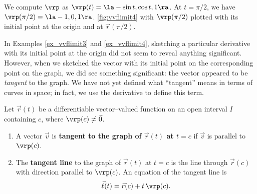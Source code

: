 {%
{ %
}%
We compute $\vrp$ as $\vrp(t) = \la -\sin t, \cos t, 1\ra$. At $t= \pi/2$, we have $\vrp(\pi/2) = \la -1,0,1\ra$. \autoref{fig:vvflimit4}  with $\vrp(\pi/2)$ plotted with its initial point at the origin and at $\vec r(\pi/2)$.}

In Examples \ref{ex_vvflimit3} and \ref{ex_vvflimit4}, sketching a particular derivative with its initial point at the origin did not seem to reveal anything significant. However, when we sketched the vector with its initial point on the corresponding point on the graph, we did see something significant: the vector appeared to be \textit{tangent} to the graph. We have not yet defined what ``tangent'' means in terms of curves in space; in fact, we use the derivative to define this term.

{Let $\vec r(t)$ be a differentiable vector--valued function on an open interval $I$ containing $c$, where $\vrp(c)\neq \vec 0$.
\begin{enumerate}
	\item A vector $\vec v$ is \textbf{tangent to the graph of $\vec r(t)$ at $t=c$} if $\vec v$ is parallel to $\vrp(c)$.
	\item	The \textbf{tangent line}  to the graph of $\vec r(t)$ at $t=c$ is the line through $\vec r(c)$ with direction parallel to $\vrp(c)$. An equation of the tangent line is 
	$$\vec \ell(t) = \vec r(c) + t\,\vrp(c).$$
\end{enumerate}}


